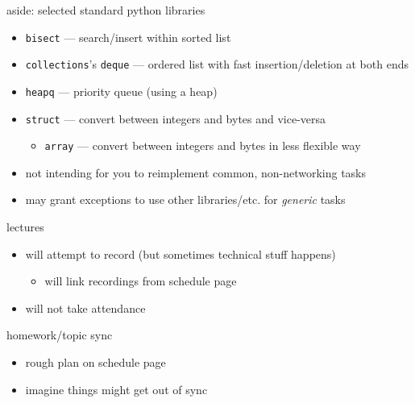 \begin{frame}{aside: selected standard python libraries}
    \begin{itemize}
    \item \texttt{bisect} --- search/insert within sorted list
    \item \texttt{collections}'s \texttt{deque} --- ordered list with fast insertion/deletion at both ends
    \item \texttt{heapq} --- priority queue (using a heap)
    \item \texttt{struct} --- convert between integers and bytes and vice-versa
        \begin{itemize}
        \item \texttt{array} --- convert between integers and bytes in less flexible way
        \end{itemize}
    \vspace{.5cm}
    \item not intending for you to reimplement common, non-networking tasks
    \item may grant exceptions to use other libraries/etc. for \textit{generic} tasks
    \end{itemize}
\end{frame}

\begin{frame}{lectures}
    \begin{itemize}
    \item will attempt to record (but sometimes technical stuff happens)
        \begin{itemize}
        \item will link recordings from schedule page
        \end{itemize}
    \item will not take attendance
    \end{itemize}
\end{frame}

\begin{frame}{homework/topic sync}
    \begin{itemize}
    \item rough plan on schedule page
    \item imagine things might get out of sync
    \end{itemize}
\end{frame}
